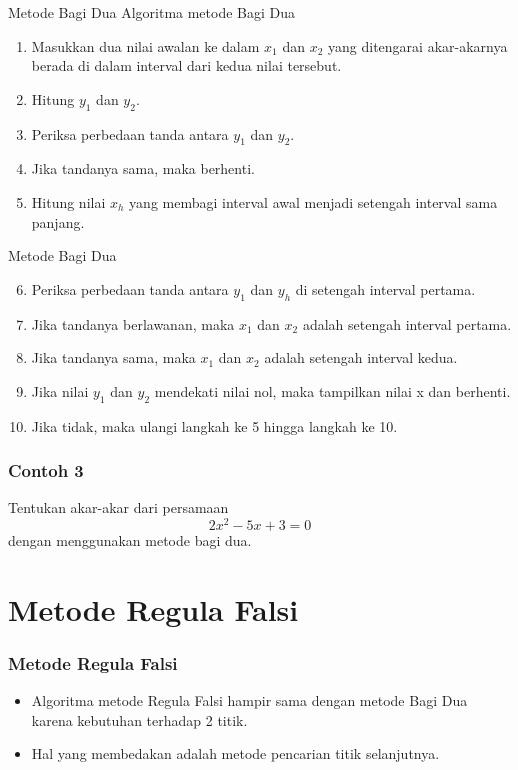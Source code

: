 \documentclass[pdflatex,compress,mathserif]{beamer}
\begin{document}
\begin{frame}{Metode Bagi Dua}
	Algoritma metode Bagi Dua
	\begin{enumerate}
		\item Masukkan dua nilai awalan ke dalam $ x_1 $ dan $ x_2 $ yang ditengarai akar-akarnya berada di dalam interval dari kedua nilai tersebut.
		\item Hitung $ y_1 $ dan $ y_2 $.
		\item Periksa perbedaan tanda antara $ y_1 $ dan $ y_2 $.
		\item Jika tandanya sama, maka berhenti.
		\item Hitung nilai $ x_h $ yang membagi interval awal menjadi setengah interval sama panjang.
	\end{enumerate}
\end{frame}

\begin{frame}{Metode Bagi Dua}
	\begin{enumerate}
		\setcounter{enumi}{5}
		\item Periksa perbedaan tanda antara $ y_1 $ dan $ y_h $ di setengah interval pertama.
		\item Jika tandanya berlawanan, maka $ x_1 $ dan $ x_2 $ adalah setengah interval pertama.
		\item Jika tandanya sama, maka $ x_1 $ dan $ x_2 $ adalah setengah interval kedua.
		\item Jika nilai $ y_1 $ dan $ y_2 $ mendekati nilai nol, maka tampilkan nilai x dan berhenti.
		\item Jika tidak, maka ulangi langkah ke 5 hingga langkah ke 10.
	\end{enumerate}
\end{frame}

\begin{frame}
	\frametitle{Contoh 3}
	Tentukan akar-akar dari persamaan $$ 2x^2 - 5x + 3 = 0 $$ dengan menggunakan metode bagi dua.
\end{frame}

\section{Metode Regula Falsi}

\begin{frame}
	\frametitle{Metode Regula Falsi}
	\begin{itemize}
		\item Algoritma metode Regula Falsi hampir sama dengan metode Bagi Dua karena kebutuhan terhadap 2 titik.
		\item Hal yang membedakan adalah metode pencarian titik selanjutnya.
		
	\end{itemize}
\end{frame}
\end{document}
